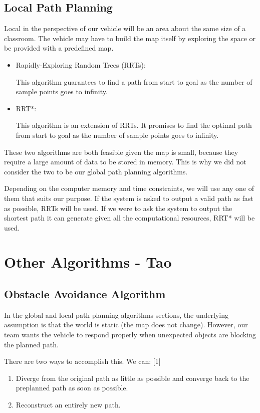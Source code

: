 \documentclass[compsoc,draftclsnofoot,onecolumn,10pt]{IEEEtran}
\begin{document}
\subsection{Local Path Planning}
Local in the perspective of our vehicle will be an area about the same size of a 
classroom. The vehicle may have to build the map itself by exploring the space or 
be provided with a predefined map.\par
\begin{itemize}
\item Rapidly-Exploring Random Trees (RRTs):\par
This algorithm guarantees to find a path from start to goal as the number of 
sample points goes to infinity.
\item RRT*:\par
This algorithm is an extension of RRTs. It promises to find the optimal path from 
start to goal as the number of sample points goes to infinity. 
\end{itemize}
These two algorithms are both feasible given the map is small, because they require 
a large amount of data to be stored in memory. This is why we did not consider the 
two to be our global path planning algorithms.\par

Depending on the computer memory and time constraints, we will use any one of them 
that suits our purpose. If the system is asked to output a valid path as fast as 
possible, RRTs will be used. If we were to ask the system to output the shortest path 
it can generate given all the computational resources, RRT* will be used.\par

\section{Other Algorithms - Tao}
\subsection{Obstacle Avoidance Algorithm}
In the global and local path planning algorithms sections, the underlying assumption 
is that the world is static (the map does not change). However, our team wants the 
vehicle to respond properly when unexpected objects are blocking the planned path.\par 

There are two ways to accomplish this. We can: [1]\par
\begin{enumerate}
\item Diverge from the original path as little as possible and converge back to 
the preplanned path as soon as possible.
\item Reconstruct an entirely new path.
\end{enumerate}
\end{document}
